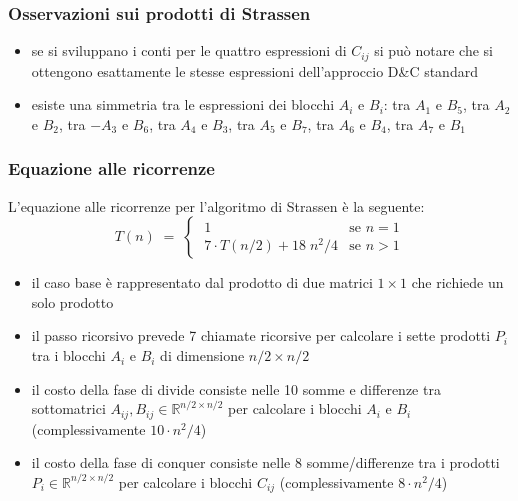 \subsubsection*{Osservazioni sui prodotti di Strassen}
\begin{itemize}
	\item se si sviluppano i conti per le quattro espressioni di \(C_{ij}\) si può notare che si ottengono esattamente
	le stesse espressioni dell'approccio D\&C standard
	\item esiste una simmetria tra le espressioni dei blocchi \(A_i\) e \(B_i\): tra \(A_1\) e \(B_5\), tra \(A_2\)
	e \(B_2\), tra \(-A_3\) e \(B_6\), tra \(A_4\) e \(B_3\), tra \(A_5\) e \(B_7\), tra \(A_6\) e \(B_4\), tra \(A_7\) e \(B_1\)
\end{itemize}

\subsubsection*{Equazione alle ricorrenze}
L'equazione alle ricorrenze per l'algoritmo di Strassen è la seguente:
\[T(n) \; = \; \begin{cases}
	\; 1 & \text{se } n = 1 \\[3pt]
	\; 7 \cdot T(n/2) + 18 \; n^2/4 & \text{se } n > 1
\end{cases}\]

\begin{itemize}
	\item il caso base è rappresentato dal prodotto di due matrici \(1 \times 1\) che richiede un solo prodotto
	\item il passo ricorsivo prevede 7 chiamate ricorsive per calcolare i sette prodotti \(P_i\) tra i blocchi \(A_i\) e \(B_i\)
	di dimensione \(n/2 \times n/2\)
	\item il costo della fase di divide consiste nelle 10 somme e differenze tra sottomatrici \(A_{ij}, B_{ij} \in \mathbb{R}^{n/2 \times n/2}\)
	per calcolare i blocchi \(A_i\) e \(B_i\) (complessivamente \(10 \cdot n^2/4\))
	\item il costo della fase di conquer consiste nelle 8 somme/differenze tra i prodotti \(P_i \in \mathbb{R}^{n/2 \times n/2}\)
	per calcolare i blocchi \(C_{ij}\) (complessivamente \(8 \cdot n^2/4\))
\end{itemize}

